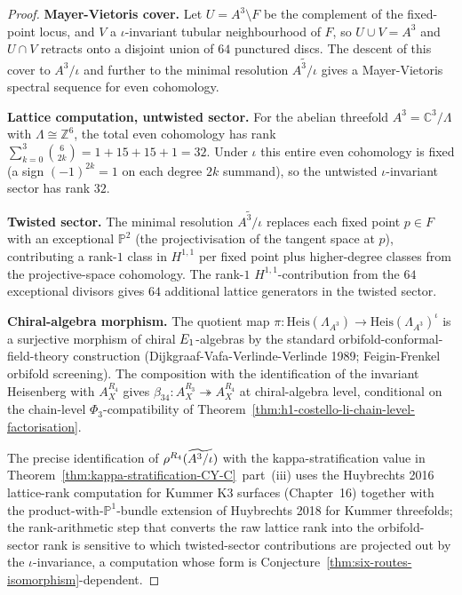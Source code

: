 \begin{proof}
\textbf{Mayer-Vietoris cover.} Let $U = A^3 \setminus F$ be the
complement of the fixed-point locus, and $V$ a $\iota$-invariant
tubular neighbourhood of $F$, so $U \cup V = A^3$ and $U \cap V$ retracts
onto a disjoint union of $64$ punctured discs. The descent of this cover
to $A^3/\iota$ and further to the minimal resolution
$\widetilde{A^3/\iota}$ gives a Mayer-Vietoris spectral sequence for even
cohomology.

\textbf{Lattice computation, untwisted sector.} For the abelian
threefold $A^3 = \mathbb{C}^3 / \Lambda$ with $\Lambda \cong \mathbb{Z}^6$,
the total even cohomology has rank
$\sum_{k=0}^{3} \binom{6}{2k} = 1 + 15 + 15 + 1 = 32$. Under $\iota$ this
entire even cohomology is fixed (a sign $(-1)^{2k} = 1$ on each degree $2k$
summand), so the untwisted $\iota$-invariant sector has rank $32$.

\textbf{Twisted sector.} The minimal resolution
$\widetilde{A^3/\iota}$ replaces each fixed point $p \in F$ with an
exceptional $\mathbb{P}^2$ (the projectivisation of the tangent space at
$p$), contributing a rank-$1$ class in $H^{1,1}$ per fixed point plus
higher-degree classes from the projective-space cohomology. The
rank-$1$ $H^{1,1}$-contribution from the $64$ exceptional divisors gives
$64$ additional lattice generators in the twisted sector.

\textbf{Chiral-algebra morphism.} The quotient map
$\pi: \mathrm{Heis}(\Lambda_{A^3}) \to \mathrm{Heis}(\Lambda_{A^3})^{\iota}$
is a surjective morphism of chiral $E_{1}$-algebras by the standard
orbifold-conformal-field-theory construction (Dijkgraaf-Vafa-Verlinde-Verlinde
1989; Feigin-Frenkel orbifold screening). The composition with the
identification of the invariant Heisenberg with $A_X^{R_4}$ gives
$\beta_{34}: A_X^{R_3} \twoheadrightarrow A_X^{R_4}$ at chiral-algebra level,
conditional on the chain-level $\Phi_3$-compatibility of
Theorem~\ref{thm:h1-costello-li-chain-level-factorisation}.

The precise identification of
$\rho^{R_4}(\widetilde{A^3/\iota})$ with the kappa-stratification value in
Theorem~\ref{thm:kappa-stratification-CY-C}~part~(iii) uses the
Huybrechts 2016 lattice-rank computation for Kummer K3 surfaces
(Chapter~16) together with the product-with-$\mathbb{P}^1$-bundle
extension of Huybrechts 2018 for Kummer threefolds; the rank-arithmetic
step that converts the raw lattice rank into the orbifold-sector rank is
sensitive to which twisted-sector contributions are projected out by the
$\iota$-invariance, a computation whose form is
Conjecture~\ref{thm:six-routes-isomorphism}-dependent.
\end{proof}

